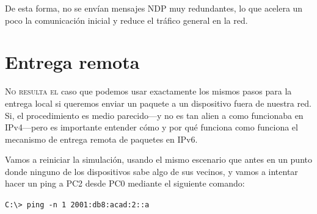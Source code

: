 \documentclass[a4paper,10pt]{corsage}
\makeatletter
\newcommand{\devname}[1]{\textsc{#1}}
\newcommand*{\@doendeq}{%
	\everypar{{\setbox\z@\lastbox}\everypar{}}%
}
\newenvironment{console}{%
	\begin{tcolorbox}[
		left skip=1cm,
		right skip=1Cm,
		left=8pt,
		right=8pt,
		top=2.5\parskip,
		bottom=2\parskip,
		colback=gray!10,
		colframe=gray!40,
		boxrule=0pt,
		leftrule=4pt,
		sharp corners=all,
		fontupper=\ttfamily\flushleft\footnotesize
	]%
}{%
	\end{tcolorbox}%
	\ignorespacesafterend\par\noindent\aftergroup\@doendeq%
}
\makeatother
\begin{document}
		De esta forma, no se envían mensajes NDP muy redundantes, lo que acelera un poco la comunicación inicial y reduce el tráfico general en la red.

	\section{Entrega remota}
		\lettrine{N}{o resulta el} caso que podemos usar exactamente los mismos pasos para la entrega local si queremos enviar un paquete a un dispositivo fuera de nuestra red.  Si, el procedimiento es medio parecido---y no es tan alien a como funcionaba en IPv4---pero es importante entender cómo y por qué funciona como funciona el mecanismo de entrega remota de paquetes en IPv6.

		Vamos a reiniciar la simulación, usando el mismo escenario que antes en un punto donde ninguno de los dispositivos sabe algo de sus vecinos, y vamos a intentar hacer un ping a \devname{PC2} desde \devname{PC0} mediante el siguiente comando:
		\begin{console}
			\verb|C:\> ping -n 1 2001:db8:acad:2::a|
		\end{console}
\end{document}
